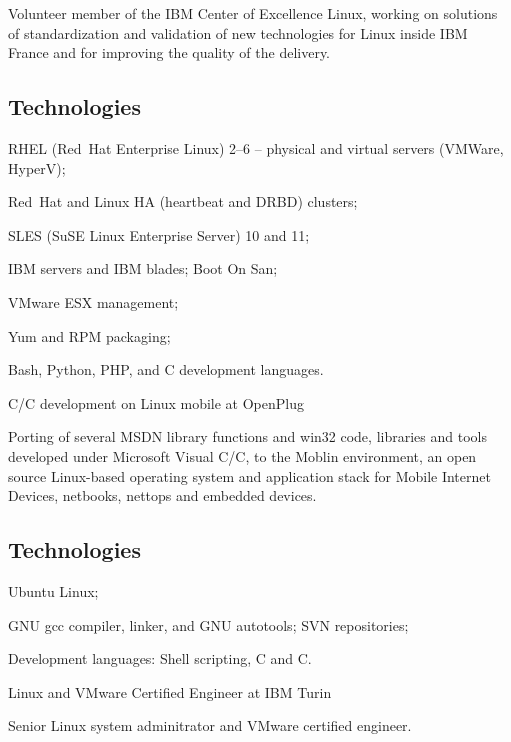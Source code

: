 \smallskip\noindent
Volunteer member of the IBM Center of Excellence Linux, working on solutions of 
standardization and validation of new technologies for Linux inside IBM France and
for improving the quality of the delivery.

\subsection{Technologies}

\item{\bdot} RHEL (Red~Hat Enterprise Linux) 2--6 -- physical and virtual
   servers (VMWare, HyperV);
\item{\bdot} Red~Hat and Linux HA (heartbeat and DRBD) clusters;
\item{\bdot} SLES (SuSE Linux Enterprise Server) 10 and 11;
\item{\bdot} IBM servers and IBM blades; Boot On San;
\item{\bdot} VMware ESX management;
\item{\bdot} Yum and RPM packaging;
\item{\bdot} Bash, Python, PHP, and C development languages.


   {C/C\plusplus{} development on Linux mobile at OpenPlug}

Porting of several MSDN library functions and win32 code, libraries and tools
developed under Microsoft Visual C/C\plusplus, to the Moblin environment,
an open source Linux-based operating system and application stack for
Mobile Internet Devices, netbooks, nettops and embedded devices.

\subsection{Technologies}

\item{\bdot} Ubuntu Linux;
\item{\bdot} GNU gcc compiler, linker, and GNU autotools; SVN repositories;
\item{\bdot} Development languages: Shell scripting, C and C\plusplus.

   {Linux and VMware Certified Engineer at IBM Turin}

Senior Linux system adminitrator and VMware certified engineer.

